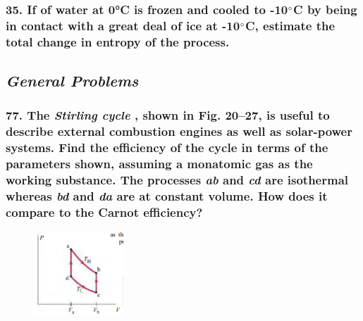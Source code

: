 \documentclass{article}
\begin{document}
\subsubsection*{
    35. If of water at 0°C is frozen and cooled to -10$\degree$C 
    by being in contact with a great deal of ice at -10$\degree$C,
    estimate the total change in entropy of the process.
}
\newpage
\begin{center}
    \subsection*{\textbf{\textit{General Problems}}}
\end{center}
\subsubsection*{
    77. The \textit{Stirling cycle} , shown in Fig. 20–27, is useful to describe
    external combustion engines as well as solar-power systems.
    Find the efficiency of the cycle in terms of the parameters
    shown, assuming a monatomic gas as the working substance. The
    processes \textit{ab} and \textit{cd} are isothermal whereas \textit{bd} and \textit{da} are at constant
    volume. How does it compare to the Carnot efficiency?
}
\begin{figure}[h]
    \includegraphics[width=0.3\textwidth]{figures/20-27.png}
\end{figure}

\newpage
\end{document}
